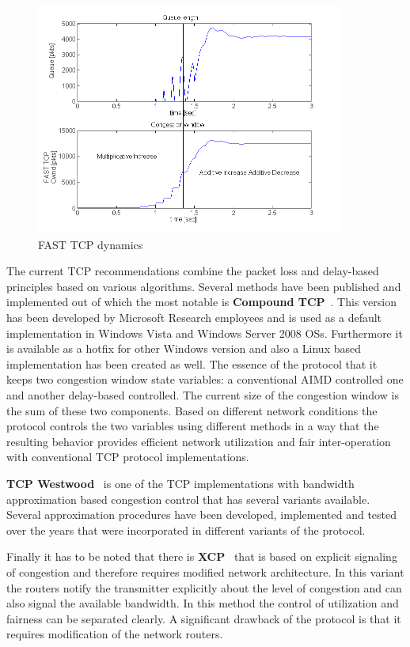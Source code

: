 \documentclass[a4paper]{article}
\begin{document}
\begin{figure}[H]
    \centering
    \includegraphics[width=0.9\textwidth]{figures/FAST.png}
    \caption{FAST TCP dynamics}
    \label{fig:FastTCP}
\end{figure}

The current TCP recommendations combine the packet loss and delay-based principles based on various algorithms. Several
methods have been published and implemented out of which the most notable is \textbf{Compound TCP}~\cite{CompundTCP}.
This version has been developed by Microsoft Research employees and is used as a default implementation in Windows
Vista and Windows Server 2008 OSs. Furthermore it is available as a hotfix for other Windows version and also a Linux
based implementation has been created as well. The essence of the protocol that it keeps two congestion window state
variables: a conventional AIMD controlled one and another delay-based controlled. The current size of the congestion
window is the sum of these two components. Based on different network conditions the protocol controls the two
variables using different methods in a way that the resulting behavior provides efficient network utilization and fair
inter-operation with conventional TCP protocol implementations.

\textbf{TCP Westwood}~\cite{TCPWestwood} is one of the TCP implementations with bandwidth approximation based
congestion control that has several variants available. Several approximation procedures have been developed,
implemented and tested over the years that were incorporated in different variants of the protocol.

Finally it has to be noted that there is \textbf{XCP}~\cite{XCP} that is based on explicit signaling of congestion and
therefore requires modified network architecture. In this variant the routers notify the transmitter explicitly about
the level of congestion and can also signal the available bandwidth. In this method the control of utilization and
fairness can be separated clearly. A significant drawback of the protocol is that it requires modification of the
network routers.
\end{document}
